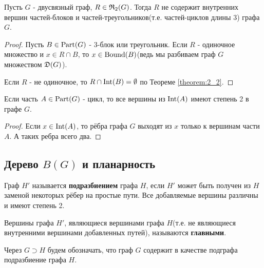 \begin{crly}[Следствие 2.1] \label{corollary:2_1}
	Пусть $G$ - двусвязный граф, $R \in \mathfrak{R}_2(G)$. Тогда $R$ не содержит внутренних вершин частей-блоков и частей-треугольников(т.е. частей-циклов длины 3) графа $G$.
\end{crly}
\begin{proof}
	Пусть $B \in \operatorname{Part}(G)$ - 3-блок или треугольник.
	Если  $R$ - одиночное множество и $x \in R \cap B$, то $x \in \operatorname{Bound}(B)$(ведь мы разбиваем граф $G$ множеством $\mathfrak{D}(G)$).
	
	Если  $R$ - не одиночное, то $R \cap \operatorname{Int}(B) = \emptyset$ по Теореме \ref{theorem:2_2}.
\end{proof}

\begin{crly}[Следствие 2.2] \label{corollary:2_2}
	Если часть $A \in \operatorname{Part}(G)$ - цикл, то все вершины из  $\operatorname{Int}(A)$ имеют степень 2 в графе $G$.
\end{crly}
\begin{proof}
	Если $x \in \operatorname{Int}(A)$, то рёбра графа $G$ выходят из $x$ только к вершинам части  $A$.
	А таких ребра всего два.
\end{proof}

\subsection{Дерево $B(G)$ и планарность}

\begin{df}[Подразбиение]
	Граф $H'$ называется \textbf{подразбиением} графа $H$, если  $H'$ может быть получен из  $H$ заменой некоторых рёбер на простые пути.
	Все добавляемые вершины различны и имеют степень 2. 

	Вершины графа $H'$, являющиеся вершинами графа  $H$(т.е. не являющиеся внутренними вершинами добавленных путей), называются \textbf{главными}.
\end{df}

\begin{prop}
	Через $G \supset H$ будем обозначать, что граф  $G$ содержит в качестве подграфа подразбиение графа  $H$.
\end{prop}

